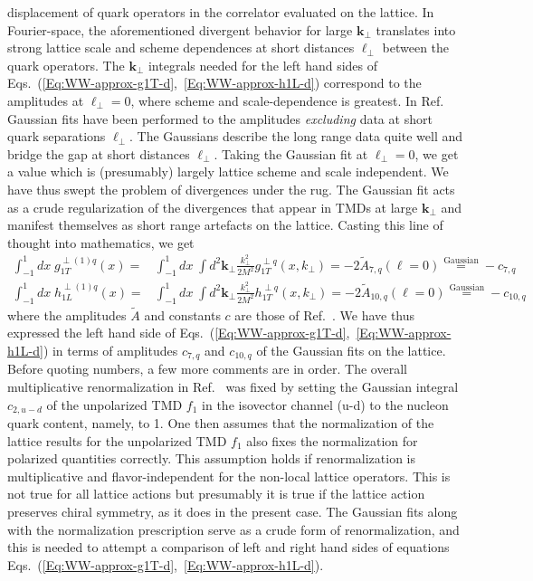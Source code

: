 \documentclass[a4paper,11pt]{article}
\newcommand{\ba}{\begin{eqnarray}}
\newcommand{\ea}{\end{eqnarray}}
\def\bflperp{{\bm \ell}_\perp}
\def\bfkperp{{\bm k}_\perp}
\def\kperp{k_\perp}
\begin{document}
displacement of quark operators in the correlator evaluated on the lattice. 
In Fourier-space, the aforementioned divergent behavior for large $\bfkperp$ 
translates into strong lattice scale and scheme dependences at short distances
$\bflperp$ between the quark operators. The $\bfkperp$ integrals needed for 
the left hand sides of Eqs.~(\ref{Eq:WW-approx-g1T-d},~\ref{Eq:WW-approx-h1L-d})
correspond to the amplitudes at $\bflperp = 0$, where scheme and 
scale-dependence is greatest.  In Ref.~\cite{Musch:2010ka} Gaussian fits 
have been performed to the amplitudes \emph{excluding} data at short quark 
separations $\bflperp$. The Gaussians describe the long range data quite well 
and bridge the gap at short distances $\bflperp$. 
Taking the Gaussian fit at $\bflperp = 0$, we get a value which is 
(presumably) largely lattice scheme and scale independent. We have thus 
swept the problem of divergences under the rug. The Gaussian fit acts as 
a crude regularization of the divergences that appear in TMDs at large 
$\bfkperp$ and manifest themselves as short range artefacts on the lattice. 
Casting this line of thought into mathematics, we get
\ba
    	\int_{-1}^1 d x\; g_{1T}^{\perp(1)q}(x) 
	= & \int_{-1}^1 d x\; \int  d^2 \bfkperp 
	\frac{\kperp^2}{2M^2} g_{1T}^{\perp q}(x,\kperp) 
	= -2 \tilde{A}_{7,q}( \ell = 0 ) 
	\stackrel{\text{Gaussian}}{=} -c_{7,q}\\
    	\int_{-1}^1 d x\; h_{1L}^{\perp(1)q}(x) 
	= & \int_{-1}^1 d x\; \int  d^2 \bfkperp 
	\frac{\kperp^2}{2M^2} h_{1T}^{\perp q}(x,\kperp) 
	= -2 \tilde{A}_{10,q}( \ell = 0 ) 
	\stackrel{\text{Gaussian}}{=} -c_{10,q}
\ea
where the amplitudes $\tilde{A}$ and constants $c$ are those of Ref.~\cite{Musch:2010ka}.
We have thus expressed the left hand side of 
Eqs.~(\ref{Eq:WW-approx-g1T-d},~\ref{Eq:WW-approx-h1L-d}) in terms of 
amplitudes $c_{7,q}$ and $c_{10,q}$ of the Gaussian fits on the lattice.
Before quoting numbers, a few more comments are in order. The overall 
multiplicative renormalization in Ref.~\cite{Musch:2010ka} was fixed by 
setting the Gaussian integral $c_{2,u-d}$ of the unpolarized TMD $f_1$ 
in the isovector channel (u-d) to the nucleon quark content, namely, to 1.
 One then assumes that the normalization of the lattice results for the 
unpolarized TMD $f_1$ also fixes the normalization for polarized quantities 
correctly. This assumption holds if renormalization is multiplicative and 
flavor-independent for the non-local lattice operators. This is not true 
for all lattice actions \cite{Yoon:2017qzo} %
but presumably it is true if the lattice action preserves chiral symmetry, 
as it does in the present case.
The Gaussian fits along with the normalization prescription serve as
a crude form of renormalization, and this is needed to attempt
a comparison of left and right hand sides of equations  
Eqs.~(\ref{Eq:WW-approx-g1T-d},~\ref{Eq:WW-approx-h1L-d}).
\end{document}
